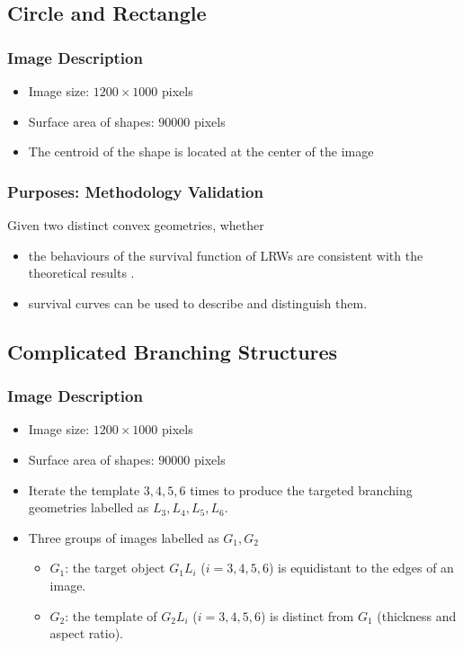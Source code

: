 


\subsection{Circle and Rectangle}

   \subsubsection{Image Description}
      \begin{itemize}
        \item Image size: $1200 \times 1000$ pixels
        \item Surface area of shapes: $90000$ pixels
        \item The centroid of the shape is located at the center of the image
      \end{itemize}
      
   \subsubsection{Purposes: Methodology Validation}
       \par 
       Given two distinct convex geometries, whether
       \begin{itemize}
         \item the behaviours of the survival function of LRWs are consistent with the theoretical results \cite{DesjardinsS1994HAFO}.
         \item survival curves can be used to describe and distinguish them.
       \end{itemize}
       

   \subsection{Complicated Branching Structures}
       
     \subsubsection{Image Description}
       \begin{itemize}
         \item Image size: $1200 \times 1000$ pixels
         \item Surface area of shapes: $90000$ pixels
         \item Iterate the template $3, 4, 5, 6$ times to produce the targeted branching geometries labelled as $L_3, L_4, L_5, L_6$.
         \item Three groups of images labelled as $G_1, G_2$

           \begin{itemize}
             \item $G_1$: the target object $G_1 L_i$ ($i=3, 4, 5, 6$) is equidistant to the edges of an image.
             \item $G_2$: the template of $G_2 L_i$ ($i=3, 4, 5, 6$) is distinct from $G_1$ (thickness and aspect ratio). 
           \end{itemize}
       \end{itemize}
       
